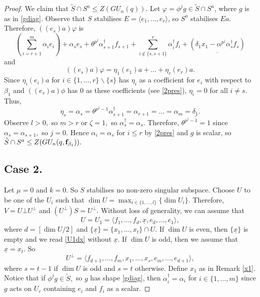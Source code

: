 \begin{proof}
We claim that $\tilde{S} \cap S^a \le Z(GU_n(q)).$ Let $\varphi= \phi^jg \in \tilde{S} \cap S^a$, where $g$ is as in \eqref{gdiag}. Observe that $S$ stabilises  $E=\langle e_1, \ldots, e_r \rangle$, so $S^a$ stabilises $Ea.$ Therefore, $((e_s)a)\varphi$ is
\begin{equation}\label{2pres}
(\sum_{i=r+1}^m \alpha_i e_i)+ \alpha_s e_s + \theta^{p^j} \alpha_{s+1}^{\dagger} f_{s+1} + \sum_{i \notin \{s,s+1\}}^r \alpha_i^{\dagger} f_i + \underline{(\delta_1 x_1-\alpha^{p^j} \alpha_s^{\dagger} f_s)}
\end{equation}
and
$$((e_s)a)\varphi= \eta_1 (e_1)a+ \ldots +\eta_{r}(e_{r})a.$$
Since $\eta_i(e_i)a$ for $i \in \{1, \ldots, r\} \backslash \{s\}$ has $\eta_i$ as a coefficient for $e_i$ with respect to $\beta_1$ and $((e_s)a)\phi$ has $0$ as these coefficients (see  \eqref{2pres}), $\eta_i=0$ for all $i\ne s.$  Thus, $$\eta_s= \alpha_s=\theta^{p^j-1} \alpha_{s+1}^{\dagger} =\alpha_{r+1}=\ldots=\alpha_m=\underline{\delta_1}.$$
Observe $l>0,$ so $m>r$ or ${\zeta}=1,$ so $\alpha_s^{\dagger}=\alpha_s.$ Therefore,  $\theta^{p^j-1}=1$ since $\alpha_s=\alpha_{s+1},$ so $j=0.$  Hence $\alpha_i=\alpha_s$ for $i \le r$ by \eqref{2pres} and  $g$ is scalar, so $\tilde{S} \cap S^a\le Z(GU_n(q,{\bf f}_{\beta_1})).$





\subsection*{Case 2.} Let $\mu=0$ and $k=0.$ So $S$   stabilises no non-zero singular subspace. Choose $U$
 to be one of the $U_i$ such that $\dim U = \max_{i \in \{1, \ldots, l\}} \{\dim U_i\}.$ Therefore, $V=U\bot U^{\bot}$ and $(U^{\bot})S=U^{\bot}.$ Without loss of generality, we can assume  that 
\begin{equation}
\label{U1dx}
U=U_1=\langle f_1, \ldots, f_{d}, \underline{x}, e_d, \ldots, e_1 \rangle,
\end{equation}
where $d=[\dim U /2]$ and $\{\underline{x}\}=\{x_1, \ldots, x_t\} \cap U$. If $\dim U$ is even, then  $\{\underline{x}\}$ is empty   and we read \eqref{U1dx} without $\underline{x}.$ If $\dim U$ is odd, then we assume that $\underline{x}=x_t.$ So 
$$U^{\bot}=\langle f_{d+1}, \ldots, f_{m}, {x_1, \ldots,x_s }, e_{m}, \ldots, e_{d+1} \rangle,$$
where $s=t-1$ if $\dim U$ is odd and $s=t$ otherwise. Define $x_1$ as in Remark \ref{x1}. Notice that if $\phi^j g \in \tilde{S},$ so $g$ has shape \eqref{gdiag}, %
 then $\alpha_i^{\dagger} = \alpha_i$ for $i \in \{1, \ldots, m\}$ since $g$ acts on $U_r$ containing $e_i$ and $f_i$ as a scalar.


\end{proof}
